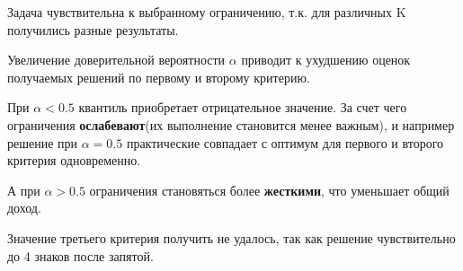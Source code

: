 \documentclass[14pt,a4paper,report]{report}
\begin{document}
Задача чувствительна к выбранному ограничению, т.к. для различных K получились разные результаты. 

Увеличение доверительной вероятности $\alpha$ приводит к ухудшению оценок получаемых решений по первому и второму критерию. 

При $\alpha < 0.5$ квантиль приобретает отрицательное значение. За счет чего ограничения \textbf{ослабевают}(их выполнение становится менее важным), и например решение при $\alpha = 0.5$ практические совпадает с оптимум для первого и второго критерия одновременно.

А при $\alpha > 0.5$ ограничения становяться более \textbf{жесткими}, что уменьшает общий доход.

Значение третьего критерия получить не удалось, так как решение чувствительно до 4 знаков после запятой.
\end{document}
